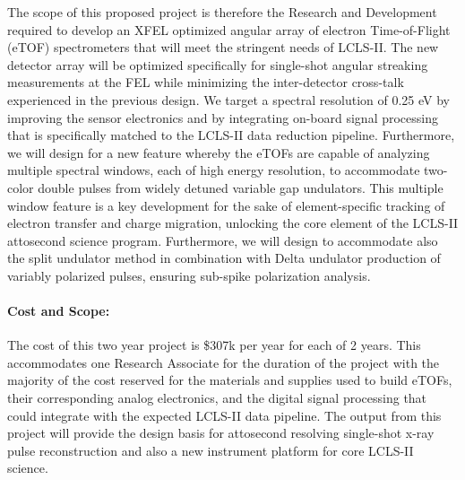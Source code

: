The scope of this proposed project is therefore the Research and Development required to develop an XFEL optimized angular array of electron Time-of-Flight (eTOF) spectrometers that will meet the stringent needs of LCLS-II. 
The new detector array will be optimized specifically for single-shot angular streaking measurements at the FEL while minimizing the inter-detector cross-talk experienced in the previous design.
We target a spectral resolution of 0.25 eV by improving the sensor electronics and by integrating on-board signal processing that is specifically matched to the LCLS-II data reduction pipeline. 
Furthermore, we will design for a new feature whereby the eTOFs are capable of analyzing multiple spectral windows, each of high energy resolution, to accommodate two-color double pulses from widely detuned variable gap undulators. 
This multiple window feature is a key development for the sake of element-specific tracking of electron transfer and charge migration, unlocking the core element of the LCLS-II attosecond science program. 
Furthermore, we will design to accommodate also the split undulator method in combination with Delta undulator production of variably polarized pulses, ensuring sub-spike polarization analysis.

\paragraph{Cost and Scope:}
The cost of this two year project is \$307k per year for each of 2 years.
This accommodates one Research Associate for the duration of the project with the majority of the cost reserved for the materials and supplies used to build eTOFs, their corresponding analog electronics, and the digital signal processing that could integrate with the expected LCLS-II data pipeline.
The output from this project will provide the design basis for attosecond resolving single-shot x-ray pulse reconstruction and also a new instrument platform for core LCLS-II science.




